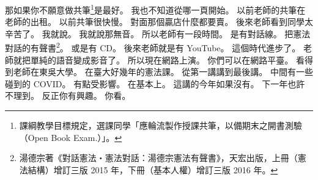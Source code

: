\hypertarget{c01:cue:1000}{}那如果你不願意做共筆\footnote{課綱教學目標規定，選課同學「應輪流製作授課共筆，以備期末之開書測驗（Open Book Exam.）」。}是最好。
\hypertarget{c01:cue:1001}{}我也不知道從哪一頁開始。
\hypertarget{c01:cue:1002}{}以前老師的共筆在老師的出租。
\hypertarget{c01:cue:1003}{}以前共筆很快慢。
\hypertarget{c01:cue:1004}{}對面那個贏店什麼都要賣。
\hypertarget{c01:cue:1005}{}後來老師看到同學太辛苦了。
\hypertarget{c01:cue:1006}{}我就說。
\hypertarget{c01:cue:1007}{}我就說那無音。
\hypertarget{c01:cue:1008}{}所以老師有一段時間。
\hypertarget{c01:cue:1009}{}是有對話線。
\hypertarget{c01:cue:1010}{}把憲法對話的有聲書\footnote{湯德宗著《對話憲法‧憲法對話：湯德宗憲法有聲書》，天宏出版，上冊（憲法結構）增訂三版 2015 年，下冊（基本人權）增訂三版 2016 年。}。
\hypertarget{c01:cue:1011}{}或是有 CD。
\hypertarget{c01:cue:1012}{}後來老師就是有 YouTube。
\hypertarget{c01:cue:1013}{}這個時代進步了。
\hypertarget{c01:cue:1014}{}老師就把單純的語音變成影音了。
\hypertarget{c01:cue:1015}{}所以現在網路上演。
\hypertarget{c01:cue:1016}{}你們可以在網路平臺。
\hypertarget{c01:cue:1017}{}看得到老師在東吳大學。
\hypertarget{c01:cue:1018}{}在臺大好幾年的憲法課。
\hypertarget{c01:cue:1019}{}從第一講講到最後講。
\hypertarget{c01:cue:1020}{}中間有一些碰到的 COVID。
\hypertarget{c01:cue:1021}{}有點受影響。
\hypertarget{c01:cue:1022}{}在基本上。
\hypertarget{c01:cue:1023}{}這講的今年如果沒有。
\hypertarget{c01:cue:1024}{}下一年也許不理到。
\hypertarget{c01:cue:1025}{}反正你有興趣。
\hypertarget{c01:cue:1026}{}你看。

